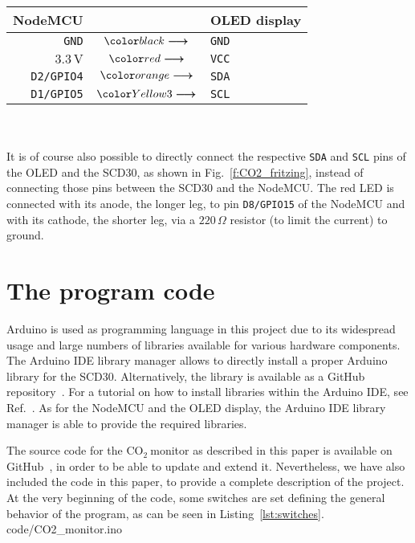 \documentclass[12pt,a4paper]{article}
\newcommand*{\mathcolor}{}
\def\mathcolor#1#{\mathcoloraux{#1}}
\newcommand*{\mathcoloraux}[3]{%
  \protect\leavevmode
  \begingroup
    \color#1{#2}#3%
  \endgroup
}
\newcommand{\coo}{\ensuremath{\mathrm{CO_2}~}}
\begin{document}
\begin{tabular}{rcl}\toprule
	NodeMCU		& & OLED display\\\hline
	\texttt{GND}		& $\mathcolor{black}{\boldsymbol{\longrightarrow}}$	& \texttt{GND}\\
	$3.3\,\mathrm{V}$	& $\mathcolor{red}{\boldsymbol{\longrightarrow}}$		& \texttt{VCC}\\
	\texttt{D2/GPIO4}	& $\mathcolor{orange}{\boldsymbol{\longrightarrow}}$ 	& \texttt{SDA}\\
	\texttt{D1/GPIO5}	& $\mathcolor{Yellow3}{\boldsymbol{\longrightarrow}}$	& \texttt{SCL}\\
	\bottomrule
\end{tabular}\\
\quad\\

It is of course also possible to directly connect the respective \texttt{SDA} and \texttt{SCL} pins of the OLED and the SCD30, as shown in Fig.~\ref{f:CO2_fritzing}, instead of connecting those pins between the SCD30 and the NodeMCU. The red LED is connected with its anode, the longer leg, to pin \texttt{D8/GPIO15} of the NodeMCU and with its cathode, the shorter leg, via a $220\,\Omega$ resistor (to limit the current) to ground.  


\section{The program code}\label{s:code}
Arduino is used as programming language in this project due to its widespread usage and large numbers of libraries available for various hardware components. The Arduino IDE library manager allows to directly install a proper Arduino library for the SCD30. Alternatively, the library is available as a GitHub repository~\cite{SPARKFUN2020}. For a tutorial on how to install libraries within the Arduino IDE, see Ref.~\cite{SPARKFUN2020A}.
As for the NodeMCU and the OLED display, the Arduino IDE library manager is able to provide the required libraries.

The source code for the \coo monitor as described in this paper is available on GitHub~\cite{KOEHN2020}, in order to be able to update and extend it. Nevertheless, we have also included the code in this paper, to provide a complete description of the project. At the very beginning of the code, some switches are set defining the general behavior of the program, as can be seen in Listing~\ref{lst:switches}.
%
{code/CO2_monitor.ino} 
\end{document}
